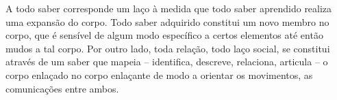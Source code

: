 A todo saber corresponde um laço à medida que todo saber aprendido realiza uma expansão do corpo. Todo saber adquirido constitui um novo membro no corpo, que é sensível de algum modo específico a certos elementos até então mudos a tal corpo. Por outro lado, toda relação, todo laço social, se constitui através de um saber que mapeia -- identifica, descreve, relaciona, articula -- o corpo enlaçado no corpo enlaçante de modo a orientar os movimentos, as comunicações entre ambos.